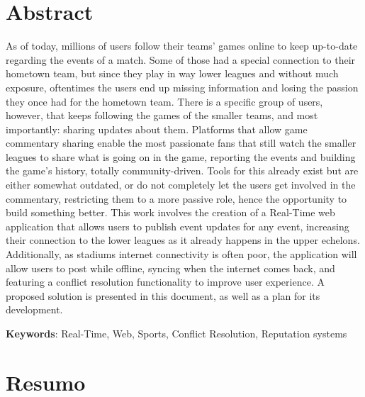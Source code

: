 \chapter*{Abstract}

As of today, millions of users follow their teams' games online to keep up-to-date regarding the events of a match. Some of those had a special connection to their hometown team, but since they play in way lower leagues and without much exposure, oftentimes the users end up missing information and losing the passion they once had for the hometown team. There is a specific group of users, however, that keeps following the games of the smaller teams, and most importantly: sharing updates about them. Platforms that allow game commentary sharing enable the most passionate fans that still watch the smaller leagues to share what is going on in the game, reporting the events and building the game's history, totally community-driven. Tools for this already exist but are either somewhat outdated, or do not completely let the users get involved in the commentary, restricting them to a more passive role, hence the opportunity to build something better. This work involves the creation of a Real-Time web application that allows users to publish event updates for any event, increasing their connection to the lower leagues as it already happens in the upper echelons. Additionally, as stadiums internet connectivity is often poor, the application will allow users to post while offline, syncing when the internet comes back, and featuring a conflict resolution functionality to improve user experience. A proposed solution is presented in this document, as well as a plan for its development.


\vspace*{10mm}\noindent
\textbf{Keywords}: Real-Time, Web, Sports, Conflict Resolution, Reputation systems

\chapter*{Resumo}

